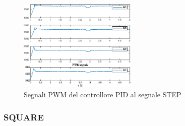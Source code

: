 \begin{figure}
	\centering
	\includegraphics[width=0.5\textwidth]{Simulazioni/Figure/PID/STEP/PWM}
	\caption{Segnali PWM del controllore PID al segnale STEP}
\end{figure}
\subsubsection{SQUARE}
